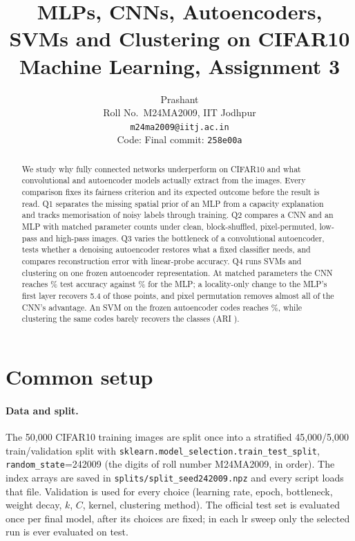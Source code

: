 \documentclass[10pt,twocolumn,a4paper]{article}
\title{MLPs, CNNs, Autoencoders, SVMs and Clustering on CIFAR10\\
\large Machine Learning, Assignment 3}
\author{Prashant\\ Roll No.\ M24MA2009, IIT Jodhpur\\ {\tt\small m24ma2009@iitj.ac.in}\\
{\small Code: \RepoURL\quad Final commit: \texttt{258e00a}}}
\begin{document}
\maketitle

\begin{abstract}
We study why fully connected networks underperform on CIFAR10 and what convolutional and
autoencoder models actually extract from the images. Every comparison fixes its fairness
criterion and its expected outcome before the result is read. Q1 separates the missing spatial
prior of an MLP from a capacity explanation and tracks memorisation of noisy labels through
training. Q2 compares a CNN and an MLP with matched parameter counts under clean, block-shuffled,
pixel-permuted, low-pass and high-pass images. Q3 varies the bottleneck of a convolutional
autoencoder, tests whether a denoising autoencoder restores what a fixed classifier needs, and
compares reconstruction error with linear-probe accuracy. Q4 runs SVMs and clustering on one
frozen autoencoder representation.
At matched parameters the CNN reaches \QcCnnCleanTest\% test accuracy against \QcMlpCleanTest\%
for the MLP; a locality-only change to the MLP's first layer recovers 5.4 of those points, and
pixel permutation removes almost all of the CNN's advantage. An SVM on the frozen
autoencoder codes reaches \QeTest\%, while clustering the same codes barely recovers the classes
(ARI \QeARI).
\end{abstract}

\section{Common setup}
\label{sec:setup}
\paragraph{Data and split.} The 50{,}000 CIFAR10 training images are split once into a stratified
45{,}000/5{,}000 train/validation split with \texttt{sklearn.model\_selection.train\_test\_split},
\texttt{random\_state}=242009 (the digits of roll number M24MA2009, in order). The index arrays are
saved in \texttt{splits/split\_seed242009.npz} and every script loads that file. Validation is used
for every choice (learning rate, epoch, bottleneck, weight decay, $k$, $C$, kernel, clustering
method). The official test set is evaluated once per final model, after its choices are fixed;
in each lr sweep only the selected run is ever evaluated on test.
\end{document}
